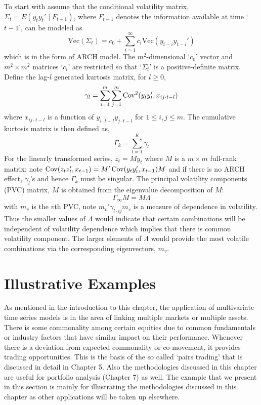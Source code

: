 To start with assume that the conditional volatility matrix, $\Sigma_t=E(y_ty_t' \;|\; F_{t-1})$, where $F_{t-1}$ denotes the information available at time `$t-1$', can be modeled as
	\begin{equation}\label{eqn:vtmodel}
	\text{Vec}(\Sigma_t)= c_0 + \sum_{i=1}^\infty c_i \text{Vec}(y_{t-i} y_{t-i}')
	\end{equation}
which is in the form of ARCH model. The $m^2$-dimensional `$c_0$' vector and $m^2 \times m^2$ matrices `$c_i$' are restricted so that `$\Sigma_t$' is a positive-definite matrix. Define the lag-$l$ generated kurtosis matrix, for $l \geq 0$,
	\begin{equation}\label{eqn:kurtosismat}
	\gamma_l = \sum_{i=1}^m \sum_{j=1}^m \Cov^2(y_t y_t', x_{ij \cdot t - l} )
	\end{equation}
where $x_{ij \cdot t - l}$ is a function of $y_{i \cdot t-l} y_{j \cdot t-l}$ for $1 \leq i,j \leq m$. The cumulative kurtosis matrix is then defined as,
	\begin{equation}\label{eqn:cumkurt}
	\Gamma_k=\sum_{l=1}^K \gamma_l
	\end{equation}
For the linearly transformed series, $z_t=My_t$ where $M$ is a $m \times m$ full-rank matrix; note $\operatorname{Cov}(z_tz_t', x_{t-1})=M' \operatorname{Cov}(y_ty_t', x_{t-1})M$ and if there is no ARCH effect, $\gamma_l$'s and hence $\Gamma_k$ must be singular. The principal volatility components (PVC) matrix, $M$ is obtained from the eigenvalue decomposition of $M$:
	\begin{equation}\label{eqn:obtainM}
	\Gamma_\infty M= M \Lambda
	\end{equation}
with $m_v$ is the $v$th PVC, note $m_v'\gamma_{l \cdot ij} m_v$ is a measure of dependence in volatility. Thus the smaller values of $\Lambda$ would indicate that certain combinations will be independent of volatility dependence which implies that there is common volatility component. The larger elements of $\Lambda$ would provide the most volatile combinations via the corresponding eigenvectors, $m_v$. 


\section{Illustrative Examples}


As mentioned in the introduction to this chapter, the application of multivariate time series models is in the area of linking multiple markets or multiple assets. There is some commonality among certain equities due to common fundamentals or industry factors that have similar impact on their performance. Whenever there is a deviation from expected commonality or co-movement, it provides trading opportunities. This is the basis of the so called `pairs trading' that is discussed in detail in Chapter 5. Also the methodologies discussed in this chapter are useful for portfolio analysis (Chapter 7) as well. The example that we present in this section is mainly for illustrating the methodologies discussed in this chapter as other applications will be taken up elsewhere.


